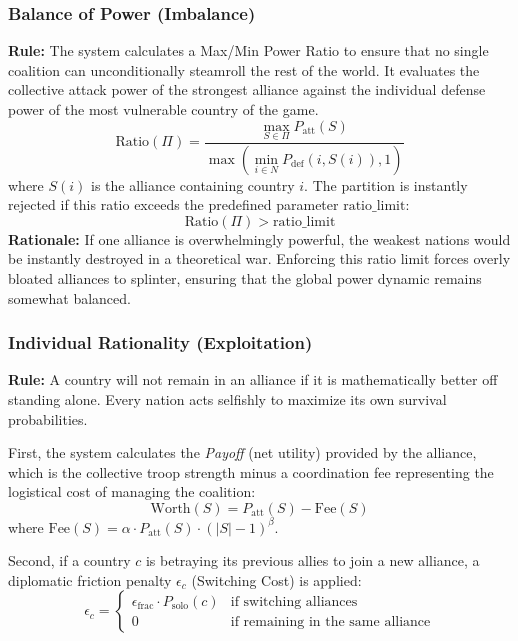 \subsubsection{Balance of Power (Imbalance)}
\textbf{Rule:} The system calculates a Max/Min Power Ratio to ensure that no single coalition can unconditionally steamroll the rest of the world. It evaluates the collective attack power of the strongest alliance against the individual defense power of the most vulnerable country of the game.
\begin{equation}
\text{Ratio}(\Pi) = \frac{\max_{S \in \Pi} P_{\text{att}}(S)}{\max\left( \min_{i \in N} P_{\text{def}}(i, S(i)), 1 \right)}
\end{equation}
where $S(i)$ is the alliance containing country $i$. The partition is instantly rejected if this ratio exceeds the predefined parameter $\text{ratio\_limit}$:
\begin{equation}
\text{Ratio}(\Pi) > \text{ratio\_limit}
\end{equation}
\textbf{Rationale:} If one alliance is overwhelmingly powerful, the weakest nations would be instantly destroyed in a theoretical war. Enforcing this ratio limit forces overly bloated alliances to splinter, ensuring that the global power dynamic remains somewhat balanced.

\subsubsection{Individual Rationality (Exploitation)}
\textbf{Rule:} A country will not remain in an alliance if it is mathematically better off standing alone. Every nation acts selfishly to maximize its own survival probabilities. 

First, the system calculates the \textit{Payoff} (net utility) provided by the alliance, which is the collective troop strength minus a coordination fee representing the logistical cost of managing the coalition:
\begin{equation}
\text{Worth}(S) = P_{\text{att}}(S) - \text{Fee}(S)
\end{equation}
where $\text{Fee}(S) = \alpha \cdot P_{\text{att}}(S) \cdot (|S| - 1)^\beta$. 

Second, if a country $c$ is betraying its previous allies to join a new alliance, a diplomatic friction penalty $\epsilon_c$ (Switching Cost) is applied:
\begin{equation}
\epsilon_c = 
\begin{cases} 
\epsilon_{\text{frac}} \cdot P_{\text{solo}}(c) & \text{if switching alliances} \\
0 & \text{if remaining in the same alliance}
\end{cases}
\end{equation}

